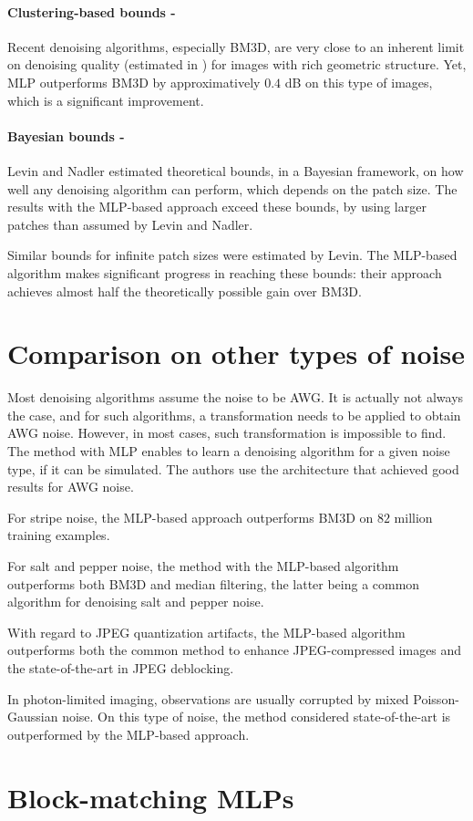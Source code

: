 \documentclass[10pt,a4paper]{article}
\newcommand{\ourparagraph}[1]{\paragraph{#1}}
\begin{document}
\ourparagraph{Clustering-based bounds -}{Recent denoising algorithms, especially BM3D, are very close to an inherent limit on denoising quality (estimated in \citep{deaddenoise}) for images with rich geometric structure. Yet, MLP outperforms BM3D by approximatively $0.4$ dB on this type of images, which is a significant improvement.


\ourparagraph{Bayesian bounds -}{Levin and Nadler \citep{Levin2011NaturalID} estimated theoretical bounds, in a Bayesian framework, on how well any denoising algorithm can perform, which depends on the patch size. The results with the MLP-based approach exceed these bounds, by using larger patches than assumed by Levin and Nadler.

Similar bounds for infinite patch sizes were estimated by Levin. The MLP-based algorithm makes significant progress in reaching these bounds: their approach achieves almost half the theoretically possible gain over BM3D.}

\section{Comparison on other types of noise}

Most denoising algorithms assume the noise to be AWG. It is actually not always the case, and for such algorithms, a transformation needs to be applied to obtain AWG noise. However, in most cases, such transformation is impossible to find. The method with MLP enables to learn a denoising algorithm for a given noise type, if it can be simulated. The authors use the architecture that achieved good results for AWG noise.

For stripe noise, the MLP-based approach outperforms BM3D on $82$ million training examples.

For salt and pepper noise, the method with the MLP-based algorithm outperforms both BM3D and median filtering, the latter being a common algorithm for denoising salt and pepper noise.

With regard to JPEG quantization artifacts, the MLP-based algorithm outperforms both the common method to enhance JPEG-compressed images and the state-of-the-art in JPEG deblocking.

In photon-limited imaging, observations are usually corrupted by mixed Poisson-Gaussian noise. On this type of noise, the method considered state-of-the-art is outperformed by the MLP-based approach.


\section{Block-matching MLPs}

}
\end{document}
